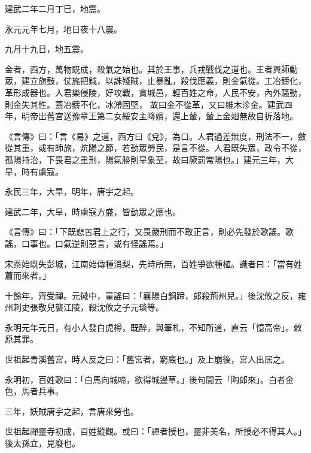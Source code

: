 \begin{pinyinscope}
 建武二年二月丁巳，地震。



 永元元年七月，地日夜十八震。



 九月十九日，地五震。



 金者，西方，萬物既成，殺氣之始也。其於王事，兵戎戰伐之道也。王者興師動眾，建立旗鼓，仗旄把鉞，以誅殘賊，止暴亂，殺伐應義，則金氣從。工冶鑄化，革形成器也。人君樂侵陵，好攻戰，貪城邑，輕百姓之命，人民不安，內外騷動，則金失其性。蓋冶鑄不化，冰滯固堅，
 故曰金不從革，又曰維木沴金。建武四年，明帝出舊宮送豫章王第二女綏安主降嬪，還上輦，輦上金翅無故自折落地。



 《言傳》曰：「言《易》之道，西方曰《兌》，為口。人君過差無度，刑法不一，斂從其重，或有師旅，炕陽之節，若動眾勞民，是言不從。人君既失眾，政令不從，孤陽持治，下畏君之重刑，陽氣勝則旱象至，故曰厥罰常陽也。」建元三年，大旱，時有虜寇。



 永民三年，大旱，明年，唐宇之起。



 建武二年，大旱，時虜寇方盛，皆動眾之應也。



 《言傳》曰：「下既悲苦君上之行，又畏嚴刑而不敢正言，則必先發於歌謠。歌謠，口事也。口氣逆則惡言，或有怪謠焉。」



 宋泰始既失彭城，江南始傳種消梨，先時所無，百姓爭欲種植。識者曰：「當有姓蕭而來者。」



 十餘年，齊受禪。元徽中，童謠曰：「襄陽白銅蹄，郎殺荊州兒。」後沈攸之反，雍州刺史張敬兒襲江陵，殺沈攸之子元琰等。



 永明元年元日，有小人發白虎樽，既醉，與筆札，不知所道，直云「憶高帝」。敕原其罪。



 世祖起青溪舊宮，時人反之曰：「舊宮者，窮廄也。」及上崩後，宮人出居之。



 永明初，百姓歌曰：「白馬向城啼，欲得城邊草。」後句間云「陶郎來」。白者金色，馬者兵事。



 三年，妖賊唐宇之起，言唐來勞也。



 世祖起禪靈寺初成，百姓縱觀。或曰：「禪者授也，靈非美名，所授必不得其人。」後太孫立，見廢也。




\end{pinyinscope}
